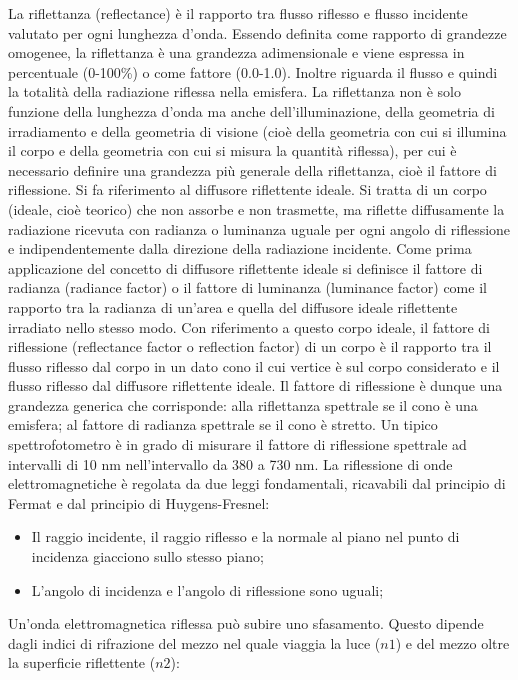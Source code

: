 La riflettanza (reflectance) è il rapporto tra flusso riflesso e flusso
incidente valutato per ogni lunghezza d'onda. Essendo definita come rapporto
di grandezze omogenee, la riflettanza è una grandezza adimensionale e viene
espressa in percentuale (0-100\%) o come fattore (0.0-1.0). Inoltre riguarda
il flusso e quindi la totalità della radiazione riflessa nella emisfera. La
riflettanza non è solo funzione della lunghezza d'onda ma anche
dell'illuminazione, della geometria di irradiamento e della geometria di
visione (cioè della geometria con cui si illumina il corpo e della geometria
con cui si misura la quantità riflessa), per cui è necessario definire una
grandezza più generale della riflettanza, cioè il fattore di riflessione. Si
fa riferimento al diffusore riflettente ideale. Si tratta di un corpo (ideale,
cioè teorico) che non assorbe e non trasmette, ma riflette diffusamente la
radiazione ricevuta con radianza o luminanza uguale per ogni angolo di
riflessione e indipendentemente dalla direzione della radiazione incidente.
Come prima applicazione del concetto di diffusore riflettente ideale si
definisce il fattore di radianza (radiance factor) o il fattore di luminanza
(luminance factor) come il rapporto tra la radianza di un'area e quella del
diffusore ideale riflettente irradiato nello stesso modo. Con riferimento a
questo corpo ideale, il fattore di riflessione (reflectance factor o
reflection factor) di un corpo è il rapporto tra il flusso riflesso dal corpo
in un dato cono il cui vertice è sul corpo considerato e il flusso riflesso
dal diffusore riflettente ideale. Il fattore di riflessione è dunque una
grandezza generica che corrisponde: alla riflettanza spettrale se il cono è
una emisfera; al fattore di radianza spettrale se il cono è stretto. Un tipico
spettrofotometro è in grado di misurare il fattore di riflessione spettrale ad
intervalli di 10 nm nell'intervallo da 380 a 730 nm. La riflessione di onde
elettromagnetiche è regolata da due leggi fondamentali, ricavabili dal
principio di Fermat e dal principio di Huygens-Fresnel:

\begin{itemize}
\item Il raggio incidente, il raggio riflesso e la normale al piano nel punto
di incidenza giacciono sullo stesso piano;
\item L'angolo di incidenza e l'angolo di riflessione sono uguali;
\end{itemize}

Un'onda elettromagnetica riflessa può subire uno sfasamento. Questo dipende
dagli indici di rifrazione del mezzo nel quale viaggia la luce ($n1$) e del
mezzo oltre la superficie riflettente ($n2$):

